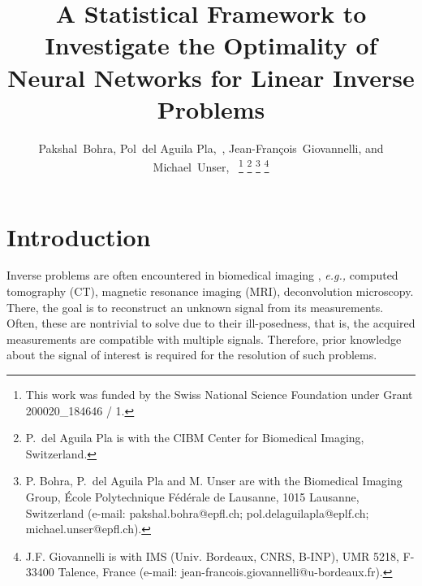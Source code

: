 \documentclass[journal]{IEEEtran}
\begin{document}
\IEEEoverridecommandlockouts


\title{A Statistical Framework to Investigate the Optimality of Neural Networks for Linear Inverse Problems}

\author{Pakshal~Bohra, Pol~{del Aguila Pla},~,
Jean-Fran\c{c}ois~Giovannelli, and Michael~Unser,~
\thanks{This work was funded by the Swiss National Science Foundation under
Grant 200020\_184646 / 1.}
\thanks{P.~{del Aguila Pla} is with the CIBM Center for Biomedical Imaging,
Switzerland.}
\thanks{P. Bohra, P.~{del Aguila Pla} and M. Unser are with the Biomedical
Imaging Group, \'{E}cole Polytechnique F\'{e}d\'{e}rale de Lausanne, 1015
Lausanne, Switzerland (e-mail: pakshal.bohra@epfl.ch;
pol.delaguilapla@eplf.ch; michael.unser@epfl.ch).}
\thanks{J.F. Giovannelli is with IMS (Univ. Bordeaux, CNRS, B-INP), UMR 5218,
F-33400 Talence, France (e-mail: jean-francois.giovannelli@u-bordeaux.fr).
}}%








\maketitle

\begin{abstract}

\end{abstract}
\begin{IEEEkeywords}

\end{IEEEkeywords}



\section{Introduction}\label{sec:intro}
Inverse problems are often encountered in biomedical imaging \cite{unser2019biomedical}, \textit{e.g.,} computed tomography (CT), magnetic resonance imaging (MRI), deconvolution microscopy. There, the goal is to reconstruct an unknown signal from its measurements. Often, these are nontrivial to solve due to their ill-posedness, that is, the acquired measurements are compatible with multiple signals. Therefore, prior knowledge about the signal of interest is required for the resolution of such problems.   
\end{document}
